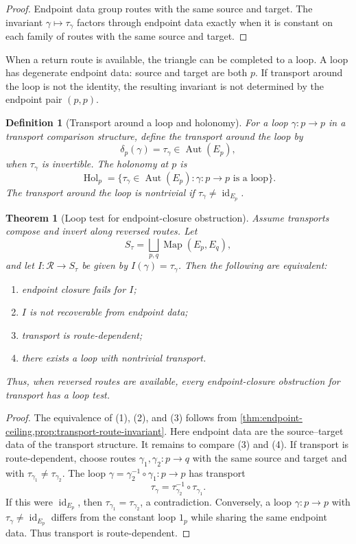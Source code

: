 \documentclass[12pt]{article}
\newtheorem{theorem}{Theorem}[section]
\newtheorem{definition}[definition]{Definition}
\newcommand{\calR}{\mathcal{R}}
\newcommand{\id}{\operatorname{id}}
\newcommand{\Aut}{\operatorname{Aut}}
\newcommand{\Hol}{\operatorname{Hol}}
\begin{document}
\begin{proof}
Endpoint data group routes with the same source and target. The invariant
$\gamma\mapsto\tau_\gamma$ factors through endpoint data exactly when it
is constant on each family of routes with the same source and target.
\end{proof}

When a return route is available, the triangle can be completed to a loop.
A loop has degenerate endpoint data: source and target are both $p$. If
transport around the loop is not the identity, the resulting invariant is
not determined by the endpoint pair $(p,p)$.

\begin{definition}[Transport around a loop and holonomy]
\label{def:loop-defect}
For a loop $\gamma:p\to p$ in a transport comparison structure, define
the transport around the loop by
\[
  \delta_p(\gamma)=\tau_\gamma\in\Aut(E_p),
\]
when $\tau_\gamma$ is invertible. The holonomy at $p$ is
\[
  \Hol_p=\{\tau_\gamma\in\Aut(E_p):\gamma:p\to p\text{ is a loop}\}.
\]
The transport around the loop is nontrivial if
$\tau_\gamma\neq\id_{E_p}$.
\end{definition}

\begin{theorem}[Loop test for endpoint-closure obstruction]
\label{thm:route-loop}
Assume transports compose and invert along reversed routes. Let
\[
  S_\tau=\bigsqcup_{p,q}\operatorname{Map}(E_p,E_q),
\]
and let $I:\calR\to S_\tau$ be given by $I(\gamma)=\tau_\gamma$.
Then the following are equivalent:
\begin{enumerate}
\item endpoint closure fails for $I$;
\item $I$ is not recoverable from endpoint data;
\item transport is route-dependent;
\item there exists a loop with nontrivial transport.
\end{enumerate}
Thus, when reversed routes are available, every endpoint-closure
obstruction for transport has a loop test.
\end{theorem}

\begin{proof}
The equivalence of (1), (2), and (3) follows from
\cref{thm:endpoint-ceiling,prop:transport-route-invariant}. Here
endpoint data are the source--target data of the transport structure. It
remains to compare (3) and (4). If transport is route-dependent, choose
routes
$\gamma_1,\gamma_2:p\to q$ with the same source and target and with
$\tau_{\gamma_1}\neq\tau_{\gamma_2}$. The loop
$\gamma=\gamma_2^{-1}\circ\gamma_1:p\to p$ has transport
\[
  \tau_\gamma=\tau_{\gamma_2}^{-1}\circ\tau_{\gamma_1}.
\]
If this were $\id_{E_p}$, then $\tau_{\gamma_1}=\tau_{\gamma_2}$, a
contradiction. Conversely, a loop $\gamma:p\to p$ with
$\tau_\gamma\neq\id_{E_p}$ differs from the constant loop $1_p$ while
sharing the same endpoint data. Thus transport is route-dependent.
\end{proof}
\end{document}
